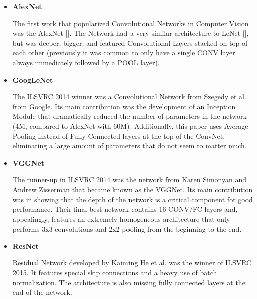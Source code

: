 \begin{itemize}
	\item \textbf{AlexNet}
	
	The first work that popularized Convolutional Networks in Computer Vision was the AlexNet []. The Network had a very similar architecture to LeNet [], but was deeper, bigger, and featured Convolutional Layers stacked on top of each other (previously it was common to only have a single CONV layer always immediately followed by a POOL layer).
	
	\item \textbf{GoogLeNet}
	
	The ILSVRC 2014 winner was a Convolutional Network from Szegedy et al. from Google. Its main contribution was the development of an Inception Module that dramatically reduced the number of parameters in the network (4M, compared to AlexNet with 60M). Additionally, this paper uses Average Pooling instead of Fully Connected layers at the top of the ConvNet, eliminating a large amount of parameters that do not seem to matter much.
	
	\item \textbf{VGGNet}
	
	The runner-up in ILSVRC 2014 was the network from Karen Simonyan and Andrew Zisserman that became known as the VGGNet. Its main contribution was in showing that the depth of the network is a critical component for good performance. Their final best network contains 16 CONV/FC layers and, appealingly, features an extremely homogeneous architecture that only performs 3x3 convolutions and 2x2 pooling from the beginning to the end. 
	
	\item \textbf{ResNet}
	
	Residual Network developed by Kaiming He et al. was the winner of ILSVRC 2015. It features special skip connections and a heavy use of batch normalization. The architecture is also missing fully connected layers at the end of the network.	 
\end{itemize}






